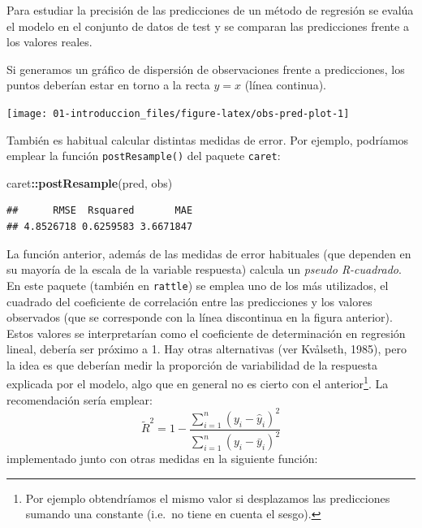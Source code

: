 \documentclass[]{book}
\newenvironment{Shaded}{\begin{snugshade}}{\end{snugshade}}
\newcommand{\KeywordTok}[1]{\textcolor[rgb]{0.13,0.29,0.53}{\textbf{#1}}}
\newcommand{\DataTypeTok}[1]{\textcolor[rgb]{0.13,0.29,0.53}{#1}}
\newcommand{\StringTok}[1]{\textcolor[rgb]{0.31,0.60,0.02}{#1}}
\newcommand{\OperatorTok}[1]{\textcolor[rgb]{0.81,0.36,0.00}{\textbf{#1}}}
\newcommand{\NormalTok}[1]{#1}
\theoremstyle{break}
\theoremstyle{definition}
\theoremstyle{definition}
\theoremstyle{definition}
\theoremstyle{remark}
\begin{document}
Para estudiar la precisión de las predicciones de un método de regresión
se evalúa el modelo en el conjunto de datos de test y se comparan las
predicciones frente a los valores reales.

Si generamos un gráfico de dispersión de observaciones frente a
predicciones, los puntos deberían estar en torno a la recta \(y=x\)
(línea continua).

\begin{Shaded}
\end{Shaded}

\begin{center}\texttt{[image: 01-introduccion\_files/figure-latex/obs-pred-plot-1]} \end{center}

También es habitual calcular distintas medidas de error. Por ejemplo,
podríamos emplear la función \texttt{postResample()} del paquete
\texttt{caret}:

\begin{Shaded}
\begin{Highlighting}[]
\NormalTok{caret}\OperatorTok{::}\KeywordTok{postResample}\NormalTok{(pred, obs)}
\end{Highlighting}
\end{Shaded}

\begin{verbatim}
##      RMSE  Rsquared       MAE 
## 4.8526718 0.6259583 3.6671847
\end{verbatim}

La función anterior, además de las medidas de error habituales (que
dependen en su mayoría de la escala de la variable respuesta) calcula un
\emph{pseudo R-cuadrado}. En este paquete (también en \texttt{rattle})
se emplea uno de los más utilizados, el cuadrado del coeficiente de
correlación entre las predicciones y los valores observados (que se
corresponde con la línea discontinua en la figura anterior). Estos
valores se interpretarían como el coeficiente de determinación en
regresión lineal, debería ser próximo a 1. Hay otras alternativas (ver
Kvålseth, 1985), pero la idea es que deberían medir la proporción de
variabilidad de la respuesta explicada por el modelo, algo que en
general no es cierto con el anterior\footnote{Por ejemplo obtendríamos
  el mismo valor si desplazamos las predicciones sumando una constante
  (i.e.~no tiene en cuenta el sesgo).}. La recomendación sería emplear:
\[\tilde R^2 = 1 - \frac{\sum_{i=1}^n(y_i - \hat y_i)^2}{\sum_{i=1}^n(y_i - \bar y_i)^2}\]
implementado junto con otras medidas en la siguiente función:
\end{document}
